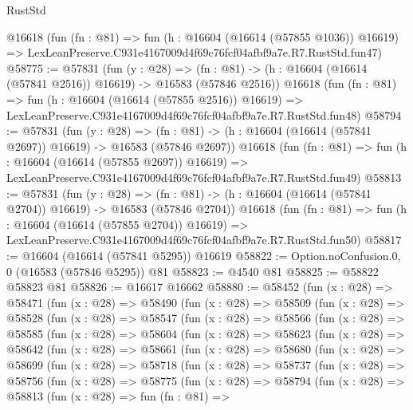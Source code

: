 \begin{lexlean}{RustStd}
\begin{coremodule}
    @16618
    (fun (fn : @81) =>
    fun (h : @16604 (@16614 (@57855 @1036)) @16619) =>
    LexLeanPreserve.C931e4167009d4f69c76fcf04afbf9a7e.R7.RustStd.fun47)
@58775 := @57831
    (fun (y : @28) =>
    (fn : @81) -> (h : @16604 (@16614 (@57841 @2516)) @16619) -> @16583 (@57846 @2516))
    @16618
    (fun (fn : @81) =>
    fun (h : @16604 (@16614 (@57855 @2516)) @16619) =>
    LexLeanPreserve.C931e4167009d4f69c76fcf04afbf9a7e.R7.RustStd.fun48)
@58794 := @57831
    (fun (y : @28) =>
    (fn : @81) -> (h : @16604 (@16614 (@57841 @2697)) @16619) -> @16583 (@57846 @2697))
    @16618
    (fun (fn : @81) =>
    fun (h : @16604 (@16614 (@57855 @2697)) @16619) =>
    LexLeanPreserve.C931e4167009d4f69c76fcf04afbf9a7e.R7.RustStd.fun49)
@58813 := @57831
    (fun (y : @28) =>
    (fn : @81) -> (h : @16604 (@16614 (@57841 @2704)) @16619) -> @16583 (@57846 @2704))
    @16618
    (fun (fn : @81) =>
    fun (h : @16604 (@16614 (@57855 @2704)) @16619) =>
    LexLeanPreserve.C931e4167009d4f69c76fcf04afbf9a7e.R7.RustStd.fun50)
@58817 := @16604 (@16614 (@57841 @5295)) @16619
@58822 := Option.noConfusion.{0, 0} (@16583 (@57846 @5295)) @81
@58823 := @4540 @81
@58825 := @58822 @58823 @81
@58826 := @16617 @16662
@58880 := @58452
    (fun (x : @28) =>
    @58471
      (fun (x : @28) =>
      @58490
        (fun (x : @28) =>
        @58509
          (fun (x : @28) =>
          @58528
            (fun (x : @28) =>
            @58547
              (fun (x : @28) =>
              @58566
                (fun (x : @28) =>
                @58585
                  (fun (x : @28) =>
                  @58604
                    (fun (x : @28) =>
                    @58623
                      (fun (x : @28) =>
                      @58642
                        (fun (x : @28) =>
                        @58661
                          (fun (x : @28) =>
                          @58680
                            (fun (x : @28) =>
                            @58699
                              (fun (x : @28) =>
                              @58718
                                (fun (x : @28) =>
                                @58737
                                  (fun (x : @28) =>
                                  @58756
                                    (fun (x : @28) =>
                                    @58775
                                      (fun (x : @28) =>
                                      @58794
                                        (fun (x : @28) =>
                                        @58813
                                          (fun (x : @28) =>
                                          fun (fn : @81) =>

\end{coremodule}
\end{lexlean}
